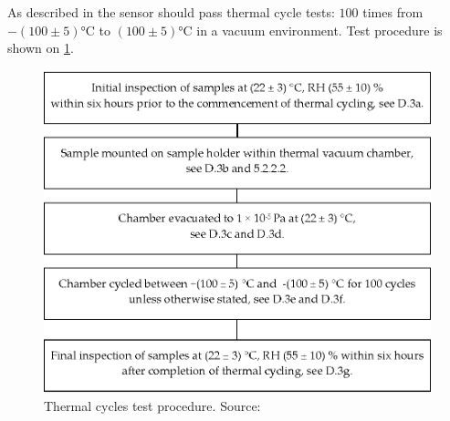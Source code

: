         As described in \cite{ECSS_Q_ST_70_04C} the sensor should pass thermal cycle tests: $100$ times from $- (100 \pm 5)$\si{\degreeCelsius} to $(100 \pm 5)$\si{\degreeCelsius} in a vacuum environment. Test procedure is shown on \ref{thermal_tests}.

        \begin{figure}[H]
            \centering
            \includegraphics[width=0.5\paperwidth]{img/thermal_cycles.eps}
            \caption{Thermal cycles test procedure. Source: \cite{ECSS_Q_ST_70_04C}}
            \label{thermal_tests}
        \end{figure}
